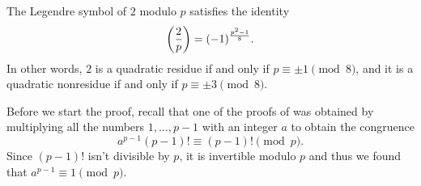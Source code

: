 \begin{theorem}\label{theorem:second-supplement}
  The Legendre symbol of $2$ modulo $p$ satisfies the identity
  \begin{equation*}
    \legendre{2}{p}=(-1)^{\frac{p^2-1}{8}}.
  \end{equation*}
  In other words, $2$ is a quadratic residue if and only if $p\equiv \pm1\pmod{8}$, and it is a quadratic nonresidue if and only if $p\equiv \pm 3\pmod{8}$.
\end{theorem}

  Before we start the proof, recall that one of the proofs of  was obtained by multiplying all the numbers $1,\ldots,p-1$ with an integer $a$ to obtain the congruence
  \begin{equation*}
    a^{p-1}(p-1)!\equiv (p-1)!\pmod{p}.
  \end{equation*}
  Since $(p-1)!$ isn't divisible by $p$, it is invertible modulo $p$ and thus we found that $a^{p-1}\equiv 1\pmod{p}$.

